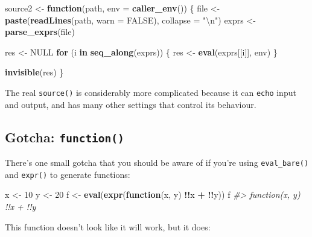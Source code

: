 \documentclass[]{book}
\makeatletter
\newenvironment{Shaded}{\begin{snugshade}}{\end{snugshade}}
\newcommand{\CharTok}[1]{\textcolor[rgb]{0.5,0.5,0.5}{#1}}
\newcommand{\CommentTok}[1]{\textcolor[rgb]{0.37,0.37,0.37}{\textit{#1}}}
\newcommand{\ControlFlowTok}[1]{\textcolor[rgb]{0.27,0.27,0.27}{\textbf{#1}}}
\newcommand{\DataTypeTok}[1]{\textcolor[rgb]{0.27,0.27,0.27}{#1}}
\newcommand{\DecValTok}[1]{\textcolor[rgb]{0.06,0.06,0.06}{#1}}
\newcommand{\KeywordTok}[1]{\textcolor[rgb]{0.27,0.27,0.27}{\textbf{#1}}}
\newcommand{\NormalTok}[1]{#1}
\newcommand{\OperatorTok}[1]{\textcolor[rgb]{0.43,0.43,0.43}{\textbf{#1}}}
\newcommand{\OtherTok}[1]{\textcolor[rgb]{0.37,0.37,0.37}{#1}}
\newcommand{\StringTok}[1]{\textcolor[rgb]{0.5,0.5,0.5}{#1}}
\newcommand{\indexc}[1]{\index{#1@\texttt{#1}}}
\makeatother
\begin{document}
\begin{Shaded}
\begin{Highlighting}[]
\NormalTok{source2 <-}\StringTok{ }\ControlFlowTok{function}\NormalTok{(path, }\DataTypeTok{env =} \KeywordTok{caller_env}\NormalTok{()) \{}
\NormalTok{  file <-}\StringTok{ }\KeywordTok{paste}\NormalTok{(}\KeywordTok{readLines}\NormalTok{(path, }\DataTypeTok{warn =} \OtherTok{FALSE}\NormalTok{), }\DataTypeTok{collapse =} \StringTok{"}\CharTok{\textbackslash{}n}\StringTok{"}\NormalTok{)}
\NormalTok{  exprs <-}\StringTok{ }\KeywordTok{parse_exprs}\NormalTok{(file)}

\NormalTok{  res <-}\StringTok{ }\OtherTok{NULL}
  \ControlFlowTok{for}\NormalTok{ (i }\ControlFlowTok{in} \KeywordTok{seq_along}\NormalTok{(exprs)) \{}
\NormalTok{    res <-}\StringTok{ }\KeywordTok{eval}\NormalTok{(exprs[[i]], env)}
\NormalTok{  \}}

  \KeywordTok{invisible}\NormalTok{(res)}
\NormalTok{\}}
\end{Highlighting}
\end{Shaded}

The real \texttt{source()} is considerably more complicated because it can \texttt{echo} input and output, and has many other settings that control its behaviour.

\hypertarget{gotcha-function}{%
\subsection{\texorpdfstring{Gotcha: \texttt{function()}}{Gotcha: function()}}\label{gotcha-function}}

\indexc{srcref}

There's one small gotcha that you should be aware of if you're using \texttt{eval\_bare()} and \texttt{expr()} to generate functions:

\begin{Shaded}
\begin{Highlighting}[]
\NormalTok{x <-}\StringTok{ }\DecValTok{10}
\NormalTok{y <-}\StringTok{ }\DecValTok{20}
\NormalTok{f <-}\StringTok{ }\KeywordTok{eval}\NormalTok{(}\KeywordTok{expr}\NormalTok{(}\ControlFlowTok{function}\NormalTok{(x, y) }\OperatorTok{!!}\NormalTok{x }\OperatorTok{+}\StringTok{ }\OperatorTok{!!}\NormalTok{y))}
\NormalTok{f}
\CommentTok{#> function(x, y) !!x + !!y}
\end{Highlighting}
\end{Shaded}

This function doesn't look like it will work, but it does:
\end{document}
